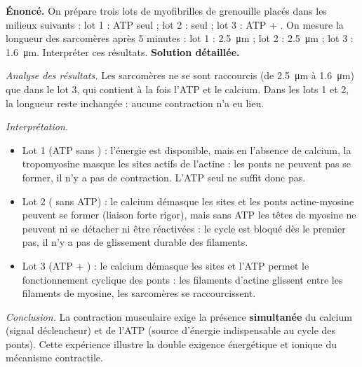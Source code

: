 \documentclass[11pt]{article}
\begin{document}
\begin{exoresolu}
\textbf{Énoncé.} On prépare trois lots de myofibrilles de grenouille placés dans les milieux suivants : lot 1 : ATP seul ; lot 2 :  seul ; lot 3 : ATP + . On mesure la longueur des sarcomères après 5 minutes : lot 1 : \SI{2,5}{\micro\meter} ; lot 2 : \SI{2,5}{\micro\meter} ; lot 3 : \SI{1,6}{\micro\meter}. Interpréter ces résultats.
\tcblower
\textbf{Solution détaillée.}

\emph{Analyse des résultats.} Les sarcomères ne se sont raccourcis (de \SI{2,5}{\micro\meter} à \SI{1,6}{\micro\meter}) que dans le lot 3, qui contient à la fois l'ATP et le calcium. Dans les lots 1 et 2, la longueur reste inchangée : aucune contraction n'a eu lieu.

\emph{Interprétation.}
\begin{itemize}
\item Lot 1 (ATP sans ) : l'énergie est disponible, mais en l'absence de calcium, la tropomyosine masque les sites actifs de l'actine : les ponts ne peuvent pas se former, il n'y a pas de contraction. L'ATP seul ne suffit donc pas.
\item Lot 2 ( sans ATP) : le calcium démasque les sites et les ponts actine-myosine peuvent se former (liaison forte rigor), mais sans ATP les têtes de myosine ne peuvent ni se détacher ni être réactivées : le cycle est bloqué dès le premier pas, il n'y a pas de glissement durable des filaments.
\item Lot 3 (ATP + ) : le calcium démasque les sites et l'ATP permet le fonctionnement cyclique des ponts : les filaments d'actine glissent entre les filaments de myosine, les sarcomères se raccourcissent.
\end{itemize}

\emph{Conclusion.} La contraction musculaire exige la présence \textbf{simultanée} du calcium (signal déclencheur) et de l'ATP (source d'énergie indispensable au cycle des ponts). Cette expérience illustre la double exigence énergétique et ionique du mécanisme contractile.
\end{exoresolu}
\end{document}
